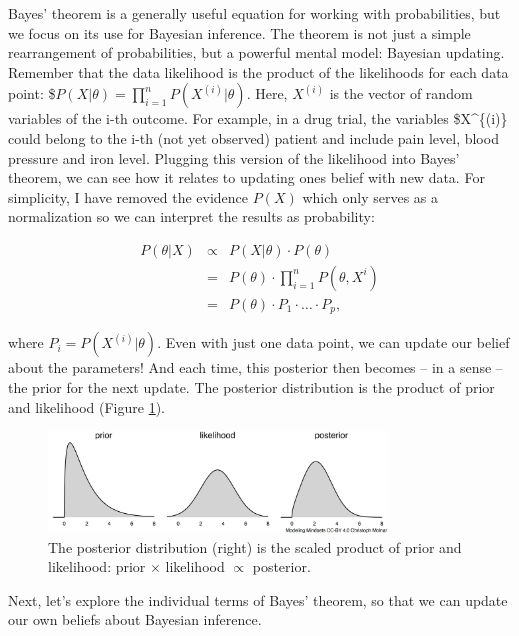 \documentclass[
  10pt,
]{scrbook}
\begin{document}
Bayes' theorem is a generally useful equation for working with probabilities, but we focus on its use for Bayesian inference.
The theorem is not just a simple rearrangement of probabilities, but a powerful mental model: Bayesian updating.
Remember that the data likelihood is the product of the likelihoods for each data point:
\$\(P(X | \theta) = \prod_{i=1}^n P(X^{(i)} | \theta)\).
Here, \(X^{(i)}\) is the vector of random variables of the i-th outcome.
For example, in a drug trial, the variables \$X\^{}\{(i)\} could belong to the i-th (not yet observed) patient and include pain level, blood pressure and iron level.
Plugging this version of the likelihood into Bayes' theorem, we can see how it relates to updating ones belief with new data.
For simplicity, I have removed the evidence \(P(X)\) which only serves as a normalization so we can interpret the results as probability:

\begin{eqnarray}
P(\theta|X) & \propto  & P(X | \theta) \cdot  P(\theta) \\ 
            & =        & P(\theta) \cdot \prod_{i=1}^n P(\theta, X^{i}) \\
            & =        & P(\theta) \cdot P_1 \cdot \ldots \cdot P_p,
\end{eqnarray}

where \(P_i = P(X^{(i)} | \theta)\).
Even with just one data point, we can update our belief about the parameters!
And each time, this posterior then becomes -- in a sense -- the prior for the next update.
The posterior distribution is the product of prior and likelihood (Figure \ref{fig:bayesian}).

\begin{figure}

{\centering \includegraphics[width=0.8\textwidth]{figures/bayesian-1} 

}

\caption{The posterior distribution (right) is the scaled product of prior and likelihood: prior $\times$ likelihood $\propto$ posterior.}\label{fig:bayesian}
\end{figure}

Next, let's explore the individual terms of Bayes' theorem, so that we can update our own beliefs about Bayesian inference.
\end{document}
